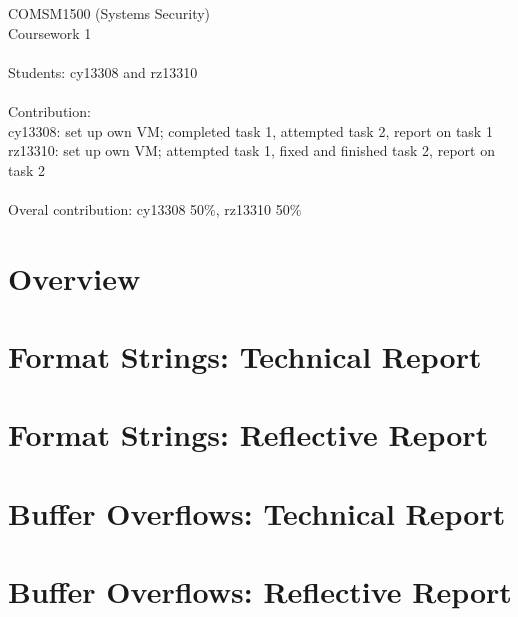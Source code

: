 \documentclass[11pt, onecolumn]{article}
\newcommand\tab[1][1cm]{\hspace*{#1}}
\begin{document}
COMSM1500 (Systems Security)\\
Coursework 1\\
\\
Students: cy13308 and rz13310 \\
\\
Contribution: \\
\tab[1cm] cy13308: set up own VM; completed task 1, attempted task 2, report on task 1\\
\tab[1cm] rz13310: set up own VM; attempted task 1, fixed and finished task 2, report on task 2
\\
\\
Overal contribution: cy13308 50\%, rz13310 50\%
\newpage


\section{Overview}


\section{Format Strings: Technical Report}


\section{Format Strings: Reflective Report}


\newpage
\section{Buffer Overflows: Technical Report}

\section{Buffer Overflows: Reflective Report}



\newpage
{}

\end{document}
